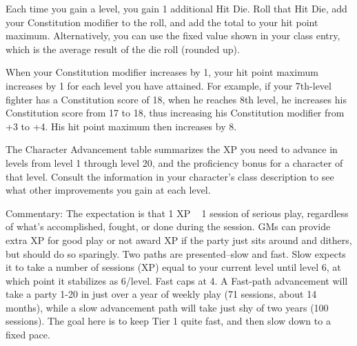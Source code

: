 Each time you gain a level, you gain 1 additional Hit Die. Roll that Hit Die, add your Constitution modifier to the roll, and add the total to your hit point maximum. Alternatively, you can use the fixed value shown in your class entry, which is the average result of the die roll (rounded up).

When your Constitution modifier increases by 1, your hit point maximum increases by 1 for each level you have attained. For example, if your 7th-level fighter has a Constitution score of 18, when he reaches 8th level, he increases his Constitution score from 17 to 18, thus increasing his Constitution modifier from +3 to +4. His hit point maximum then increases by 8.

The Character Advancement table summarizes the XP you need to advance in levels from level 1 through level 20, and the proficiency bonus for a character of that level. Consult the information in your character's class description to see what other improvements you gain at each level.

\begin{aside}
    Commentary: The expectation is that 1 XP ~ 1 session of serious play, regardless of what's accomplished, fought, or done during the session. GMs can provide extra XP for good play or not award XP if the party just sits around and dithers, but should do so sparingly. Two paths are presented--slow and fast. Slow expects it to take a number of sessions (XP) equal to your current level until level 6, at which point it stabilizes as 6/level. Fast caps at 4. A Fast-path advancement will take a party 1-20 in just over a year of weekly play (71 sessions, about 14 months), while a slow advancement path will take just shy of two years (100 sessions). The goal here is to keep Tier 1 quite fast, and then slow down to a fixed pace.
\end{aside}

